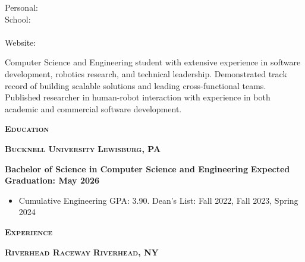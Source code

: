 \documentclass{article}
\newlength{\sectspaceabove}
\newlength{\sectspacebelow}
\newcommand{\textscbf}[1]{\textbf{\textsc{#1}}}
\newcommand{\resumesection}[1]{%
    \vspace{\sectspaceabove}%
    \begin{center}
        \textscbf{#1}
    \end{center}%
    \vspace{\sectspacebelow}%
}
\begin{document}
\begin{center}
    {\large \textscbf{\personalName}}
\end{center}

\noindent
\begin{minipage}[t]{\textwidth} 
    \centering
    \ifx\personalEmail\empty\else
        Personal: \personalEmail%
    \fi%
    \ifx\personalSchoolEmail\empty\else
        \ifx\personalEmail\empty\else\\\fi
        School: \personalSchoolEmail%
    \fi%
    \ifx\personalWebsite\empty\else
        \ifx\personalEmail\empty
            \ifx\personalSchoolEmail\empty\else\\\fi
        \else\\%
        \fi
        Website: \href{https://\personalWebsite}{\personalWebsite}%
    \fi
\end{minipage}

\vspace{1em}

\noindent
\begin{minipage}{\textwidth}
    Computer Science and Engineering student with extensive experience in software development, robotics research, and technical leadership. 
    Demonstrated track record of building scalable solutions and leading cross-functional teams. 
    Published researcher in human-robot interaction with experience in both academic and commercial software development.
\end{minipage}

\resumesection{Education}

\textscbf{Bucknell University} \hfill \textscbf{Lewisburg, PA}

\textbf{Bachelor of Science in Computer Science and Engineering} \hfill \textbf{Expected Graduation: May 2026}
\begin{itemize}[noitemsep,topsep=2pt]
    \item Cumulative Engineering GPA: 3.90. Dean's List: Fall 2022, Fall 2023, Spring 2024
\end{itemize}

\resumesection{Experience}

\textscbf{Riverhead Raceway} \hfill \textscbf{Riverhead, NY}
\end{document}
